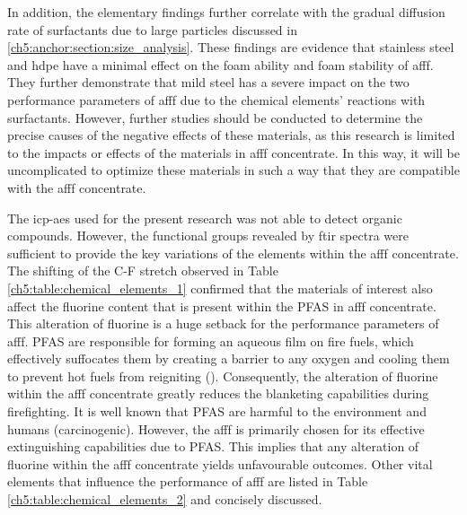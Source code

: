 In addition, the elementary findings further correlate with the gradual diffusion rate of surfactants due to large particles discussed in \ref{ch5:anchor:section:size_analysis}. These findings are evidence that stainless steel and \acrshort{hdpe} have a minimal effect on the foam ability and foam stability of \acrshort{afff}. They further demonstrate that mild steel has a severe impact on the two performance parameters of \acrshort{afff} due to the chemical elements’ reactions with surfactants. However, further studies should be conducted to determine the precise causes of the negative effects of these materials, as this research is limited to the impacts or effects of the materials in \acrshort{afff} concentrate. In this way, it will be uncomplicated to optimize these materials in such a way that they are compatible with the \acrshort{afff} concentrate.

The \acrshort{icp-aes} used for the present research was not able to detect organic compounds. However, the functional groups revealed by \acrshort{ftir} spectra were sufficient to provide the key variations of the elements within the \acrshort{afff} concentrate. The shifting of the C-F stretch observed in Table \ref{ch5:table:chemical_elements_1} confirmed that the materials of interest also affect the fluorine content that is present within the PFAS in \acrshort{afff} concentrate. This alteration of fluorine is a huge setback for the performance parameters of \acrshort{afff}. PFAS are responsible for forming an aqueous film on fire fuels, which effectively suffocates them by creating a barrier to any oxygen and cooling them to prevent hot fuels from reigniting (\cite{hinnant2020characterizing}). Consequently, the alteration of fluorine within the \acrshort{afff} concentrate greatly reduces the blanketing capabilities during firefighting. It is well known that PFAS are harmful to the environment and humans (carcinogenic). However, the \acrshort{afff} is primarily chosen for its effective extinguishing capabilities due to PFAS. This implies that any alteration of fluorine within the \acrshort{afff} concentrate yields unfavourable outcomes. Other vital elements that influence the performance of \acrshort{afff} are listed in Table \ref{ch5:table:chemical_elements_2} and concisely discussed.

